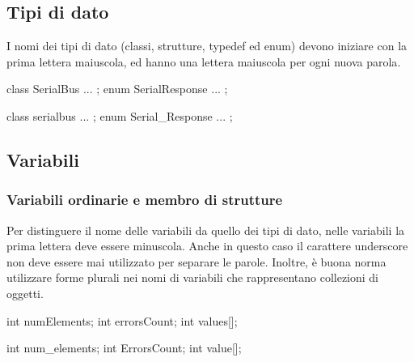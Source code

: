 \subsection{Tipi di dato}\label{ssec:typename}

I nomi dei tipi di dato (classi, strutture, typedef ed enum) devono iniziare con la prima lettera maiuscola, ed hanno una lettera maiuscola per ogni nuova parola\cite{codestyle:camel}.

\begin{minipage}[t]{\cbwidth}
\begin{RightCode}
class SerialBus { ... };
enum SerialResponse { ... };
\end{RightCode}
\end{minipage}%
\hspace{\cbdistance}
\begin{minipage}[t]{\cbwidth}
\begin{ErrorCode}
class serialbus { ... };
enum Serial_Response { ... };
\end{ErrorCode}
\end{minipage}

\subsection{Variabili}\label{ssec:variable}

\subsubsection{Variabili ordinarie e membro di strutture}\label{sssec:varnorm}

Per distinguere il nome delle variabili da quello dei tipi di dato, nelle variabili la prima lettera deve essere minuscola.
Anche in questo caso il carattere underscore non deve essere mai utilizzato per separare le parole.
Inoltre, è buona norma utilizzare forme plurali nei nomi di variabili che rappresentano collezioni di oggetti.

\begin{minipage}[t]{\cbwidth}
\begin{RightCode}
int numElements;
int errorsCount;
int values[];
\end{RightCode}
\end{minipage}%
\hspace{\cbdistance}
\begin{minipage}[t]{\cbwidth}
\begin{ErrorCode}
int num_elements;
int ErrorsCount;
int value[];
\end{ErrorCode}
\end{minipage}

